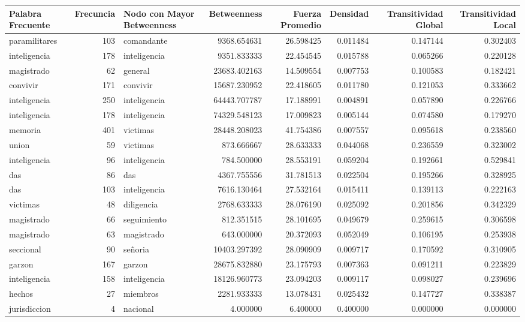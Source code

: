 \begin{tabular}{lrlrrrrr}
\toprule
Palabra Frecuente & Frecuncia & Nodo con Mayor Betweenness & Betweenness & Fuerza Promedio & Densidad & Transitividad Global & Transitividad Local \\
\midrule
paramilitares & 103 & comandante & 9368.654631 & 26.598425 & 0.011484 & 0.147144 & 0.302403 \\
inteligencia & 178 & inteligencia & 9351.833333 & 22.454545 & 0.015788 & 0.065266 & 0.220128 \\
magistrado & 62 & general & 23683.402163 & 14.509554 & 0.007753 & 0.100583 & 0.182421 \\
convivir & 171 & convivir & 15687.230952 & 22.418605 & 0.011780 & 0.121053 & 0.333662 \\
inteligencia & 250 & inteligencia & 64443.707787 & 17.188991 & 0.004891 & 0.057890 & 0.226766 \\
inteligencia & 178 & inteligencia & 74329.548123 & 17.009823 & 0.005144 & 0.074580 & 0.179270 \\
memoria & 401 & victimas & 28448.208023 & 41.754386 & 0.007557 & 0.095618 & 0.238560 \\
union & 59 & victimas & 873.666667 & 28.633333 & 0.044068 & 0.236559 & 0.323002 \\
inteligencia & 96 & inteligencia & 784.500000 & 28.553191 & 0.059204 & 0.192661 & 0.529841 \\
das & 86 & das & 4367.755556 & 31.781513 & 0.022504 & 0.195266 & 0.328925 \\
das & 103 & inteligencia & 7616.130464 & 27.532164 & 0.015411 & 0.139113 & 0.222163 \\
victimas & 48 & diligencia & 2768.633333 & 28.076190 & 0.025092 & 0.201856 & 0.342329 \\
magistrado & 66 & seguimiento & 812.351515 & 28.101695 & 0.049679 & 0.259615 & 0.306598 \\
magistrado & 63 & magistrado & 643.000000 & 20.372093 & 0.052049 & 0.106195 & 0.253938 \\
seccional & 90 & señoria & 10403.297392 & 28.090909 & 0.009717 & 0.170592 & 0.310905 \\
garzon & 167 & garzon & 28675.832880 & 23.175793 & 0.007363 & 0.091211 & 0.223829 \\
inteligencia & 158 & inteligencia & 18126.960773 & 23.094203 & 0.009117 & 0.098027 & 0.239696 \\
hechos & 27 & miembros & 2281.933333 & 13.078431 & 0.025432 & 0.147727 & 0.338387 \\
jurisdiccion & 4 & nacional & 4.000000 & 6.400000 & 0.400000 & 0.000000 & 0.000000 \\
\bottomrule
\end{tabular}
